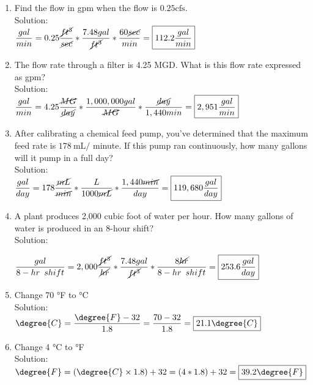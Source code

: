\begin{enumerate}[1.]
\vspace{0.2cm}
\item Find the flow in gpm when the flow is $0.25 \mathrm{cfs}$.\\
Solution:\\
\vspace{0.2cm}
$\dfrac{gal}{min}=0.25\dfrac{\cancel{ft^3}}{\cancel{sec}}*\dfrac{7.48gal}{\cancel{ft^3}}*\dfrac{60\cancel{sec}}{min}=\boxed{112.2 \dfrac{gal}{min}}$


\vspace{0.2cm}
\item The flow rate through a filter is 4.25 MGD. What is this flow rate expressed as gpm?\\
Solution:\\
\vspace{0.2cm}
$\dfrac{gal}{min}=4.25\dfrac{\cancel{MG}}{\cancel{day}}*\dfrac{1,000,000gal}{\cancel{MG}}*\dfrac{\cancel{day}}{1,440min}=\boxed{2,951 \dfrac{gal}{min}}$

\vspace{0.2cm}
\item After calibrating a chemical feed pump, you've determined that the maximum feed rate is $178 \mathrm{~mL} /$ minute. If this pump ran continuously, how many gallons will it pump in a full day?\\
Solution:\\
\vspace{0.2cm}
$\dfrac{gal}{day}=178\dfrac{\cancel{mL}}{\cancel{min}}*\dfrac{L}{1000\cancel{mL}}*\dfrac{1,440\cancel{min}}{day}=\boxed{119,680 \dfrac{gal}{day}}$


\vspace{0.2cm}
\item A plant produces 2,000 cubic foot of water per hour. How many gallons of water is produced in an 8-hour shift?\\
Solution:\\
\vspace{0.2cm}

$\dfrac{gal}{8-hr \enspace shift}=2,000\dfrac{\cancel{ft^3}}{\cancel{hr}}*\dfrac{7.48gal}{\cancel{ft^3}}*\dfrac{8\cancel{hr}}{8-hr \enspace shift}=\boxed{253.6 \dfrac{gal}{day}}$

\vspace{0.2cm}
\item Change 70 °F to °C\\
Solution:\\
\vspace{0.2cm}
$\degree{C} = \dfrac{\degree{F}-32}{1.8} = \dfrac{70-32}{1.8}=\boxed{21.1\degree{C}}$
\vspace{0.2cm}
\item Change 4 °C to °F\\
Solution:\\
\vspace{0.2cm}
$\degree{F}=(\degree{C} \times 1.8)+32 = (4*1.8)+32=\boxed{39.2\degree{F}}$



\end{enumerate}
